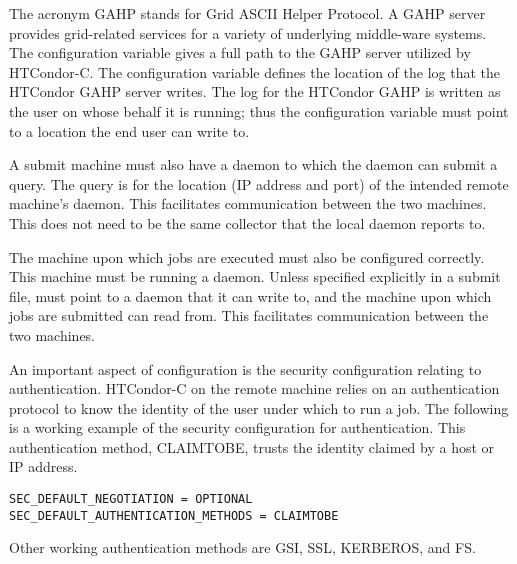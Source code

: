 The acronym GAHP stands for Grid ASCII Helper Protocol.
A GAHP server provides grid-related services for a
variety of underlying middle-ware systems.
The configuration variable 
gives a full path to the GAHP server utilized by HTCondor-C.
The configuration variable  defines
the location of the log that the HTCondor GAHP server writes.
The log for the HTCondor GAHP is written as the user on whose
behalf it is running; thus the
 configuration variable must point to a location the end
user can write to.

A submit machine must also have a  daemon to which the
 daemon can submit a query.
The query is for the location (IP address and port)
of the intended remote machine's  daemon.
This facilitates communication between the two machines.
This  does not need to be the same collector
that the local  daemon reports to.

The machine upon which jobs are executed 
must also be configured correctly.
This machine must be running a  daemon.
Unless specified explicitly in a submit file, 
 must point to a 
 daemon that it can write to,
and the machine upon which jobs are submitted can read from.
This facilitates communication between the two machines.

An important aspect of configuration is the security 
configuration relating to authentication.
HTCondor-C on the remote machine relies on an
authentication protocol to
know the identity of the user under which to run a job.
The following is a working example
of the security configuration for authentication.
This authentication method, CLAIMTOBE, 
trusts the identity claimed by a host or IP address.

\footnotesize
\begin{verbatim}
SEC_DEFAULT_NEGOTIATION = OPTIONAL
SEC_DEFAULT_AUTHENTICATION_METHODS = CLAIMTOBE
\end{verbatim}
\normalsize

Other working authentication methods are
GSI, SSL, KERBEROS, and FS.


